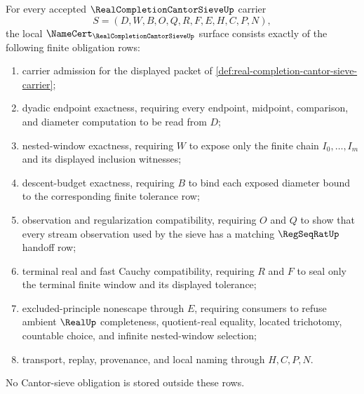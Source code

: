 \begin{theorem}
\label{thm:real-completion-cantor-sieve-namecert-obligations}
For every accepted $\RealCompletionCantorSieveUp$ carrier
$$
S=(D,W,B,O,Q,R,F,E,H,C,P,N),
$$
the local $\NameCert_{\RealCompletionCantorSieveUp}$ surface consists exactly of the following finite obligation rows:
\begin{enumerate}
\item carrier admission for the displayed packet of \autoref{def:real-completion-cantor-sieve-carrier};
\item dyadic endpoint exactness, requiring every endpoint, midpoint, comparison, and diameter computation to be read from $D$;
\item nested-window exactness, requiring $W$ to expose only the finite chain $I_0,\ldots,I_m$ and its displayed inclusion witnesses;
\item descent-budget exactness, requiring $B$ to bind each exposed diameter bound to the corresponding finite tolerance row;
\item observation and regularization compatibility, requiring $O$ and $Q$ to show that every stream observation used by the sieve has a matching $\RegSeqRatUp$ handoff row;
\item terminal real and fast Cauchy compatibility, requiring $R$ and $F$ to seal only the terminal finite window and its displayed tolerance;
\item excluded-principle nonescape through $E$, requiring consumers to refuse ambient $\RealUp$ completeness, quotient-real equality, located trichotomy, countable choice, and infinite nested-window selection;
\item transport, replay, provenance, and local naming through $H,C,P,N$.
\end{enumerate}
No Cantor-sieve obligation is stored outside these rows.
\end{theorem}
